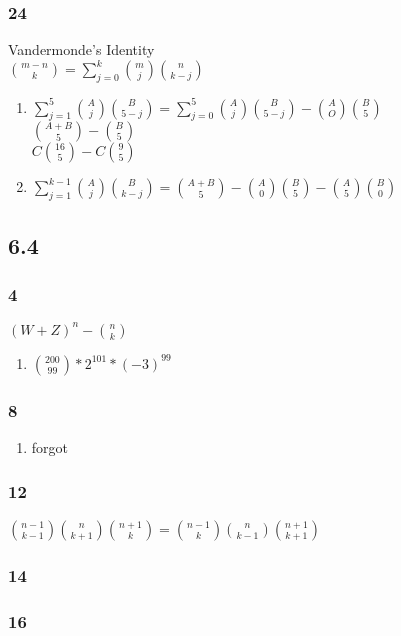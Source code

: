 \documentclass[a4paper,10pt,titlepage]{report}
\begin{document}
\subsubsection{24}
Vandermonde's Identity \\

$ \binom{m-n}{k} = \sum\limits_{j=0}^k \binom{m}{j}\binom{n}{k-j} $
\begin{enumerate}[label=(\alph*)]

\item $ \sum\limits_{j=1}^5 \binom{A}{j}\binom{B}{5-j} = \sum\limits_{j=0}^5 \binom{A}{j}\binom{B}{5-j}-\binom{A}{O}\binom{B}{5}$  \\
$\binom{A+B}{5} - \binom{B}{5}  $\\ $ C \binom{16}{5} - C\binom{9}{5} $
\item $\sum\limits_{j=1}^{k-1} \binom{A}{j}\binom{B}{k-j} = \binom{A+B}{5} - \binom{A}{0}\binom{B}{5}-\binom{A}{5}\binom{B}{0} $


\end{enumerate}
\subsection{6.4}
\subsubsection{4}
$ (W+Z)^n - \binom{n}{k} $
\begin{enumerate}[label=(\alph*)]
\item $\binom{200}{99}*2^101*(-3)^99 $

\end{enumerate}
\subsubsection{8}
\begin{enumerate}[label=(\alph*)]
\item forgot

\end{enumerate}
\subsubsection{12}
$ \binom{n-1}{k-1} \binom{n}{k+1} \binom{n+1}{k} = \binom{n-1}{k} \binom{n}{k-1} \binom{n+1}{k+1} $
\subsubsection{14}

\subsubsection{16}
\end{document}
